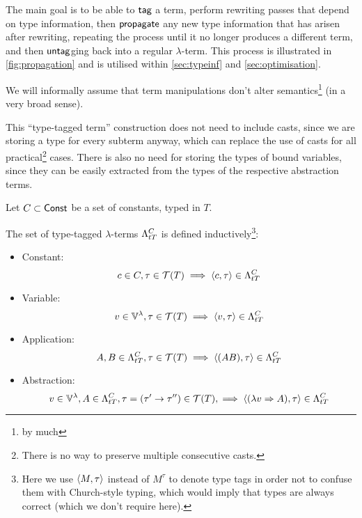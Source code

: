 \documentclass[main.tex]{subfiles}
\begin{document}
The main goal is to be able to $\mcf{tag}$ a term,
perform rewriting passes that depend on type information, then $\mcf{propagate}$
any new type information that has arisen after rewriting, repeating the
process until it no longer produces a different term, and then $\mcf{untag}$ging
back into a regular $\lambda$-term. This process is illustrated in
\cref{fig:propagation} and is utilised within \cref{sec:typeinf} and
\cref{sec:optimisation}.


We will informally assume that term manipulations don't alter semantics\footnote{
    by much} (in a very broad sense).

This ``type-tagged term'' construction  does not need to include casts, since we are storing
a type for every subterm anyway, which can replace the use of casts for all
practical\footnote{
    There is no way to preserve multiple consecutive casts.
} cases. There is also no need for storing the types of bound variables, since
they can be easily extracted from the types of the respective abstraction terms.
\begin{defn}
    Let $C \subset \const$ be a set of constants, typed in $T$.

    The set of type-tagged $\lambda$-terms $\ttlambda{T}{C}$ is defined inductively\footnote{
        Here we use $\ttt{ M}{ \tau }$ instead of $M^\tau$
        to denote type tags in order not to confuse them with Church-style
        typing, which would imply that types are always correct (which we
        don't require here).
    }:
    \begin{itemize}
        \item Constant:
            \[ c \in C, \tau \in \tclos{T} \implies \ttt{c}{\tau} \in \ttlambda{T}{C} \]
        \item Variable:
            \[ v \in \lvars, \tau \in \tclos{T} \implies \ttt{v}{\tau} \in \ttlambda{T}{C} \]
        \item Application:
            \[ A, B \in \ttlambda{T}{C}, \tau \in \tclos{T} \implies \ttt{(AB)}{\tau} \in \ttlambda{T}{C} \]
        \item Abstraction:
            \[ v \in \lvars, A \in \ttlambda{T}{C},
                \tau = (\tau' \tot \tau'') \in \tclos{T},
                \implies \ttt{(\lambda v \abstr A)}{\tau} \in \ttlambda{T}{C} \]
    \end{itemize}
\end{defn}
\end{document}
